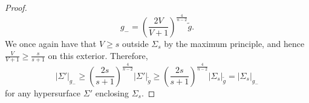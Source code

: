 \documentclass[12pt,twoside]{article}
\theoremstyle{plain}
\theoremstyle{definition}
\theoremstyle{remark}
\numberwithin{equation}{section}
\begin{document}
\begin{proof}
\begin{equation*}
g_{-} = \left( \frac{2V}{V+1} \right)^{\frac{4}{n-2}} \widetilde{g}.
\end{equation*}
We once again have that $V \geq s$ outside $\Sigma_{s}$ by the maximum principle, and hence $\frac{V}{V+1} \geq \frac{s}{s+1}$ on this exterior. Therefore,
\begin{equation*}
|\Sigma'|_{g_{-}} \geq \left( \frac{2s}{s+1} \right)^{\frac{4}{n-2}} |\Sigma'|_{\widetilde{g}} \geq \left( \frac{2s}{s+1} \right)^{\frac{4}{n-2}} |\Sigma_{s}|_{\widetilde{g}}= |\Sigma_{s}|_{g_{-}}
\end{equation*}
for any hypersurface $\Sigma'$ enclosing $\Sigma_{s}$.








\end{proof}
\end{document}
